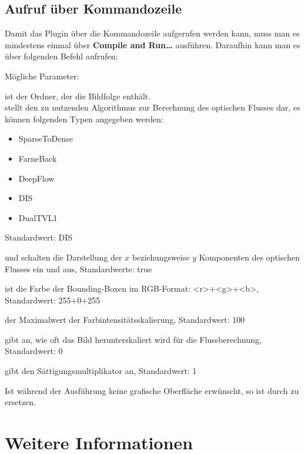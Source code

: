 \section{Aufruf über Kommandozeile}

Damit das Plugin über die Kommandozeile aufgerufen werden kann, muss man es mindestens einmal über \textbf{Compile and Run\dots} ausführen. Daraufhin kann man es über folgenden Befehl aufrufen:



Mögliche Parameter:

 ist der Ordner, der die Bildfolge enthält.
 \\

 stellt den zu nutzenden Algorithmus zur Berechnung des optischen Flusses dar, es können folgenden Typen angegeben werden:

\begin{itemize}
\item SparseToDense
\item FarneBack
\item DeepFlow
\item DIS
\item DualTVL1
\end{itemize}

Standardwert: DIS 

 und  schalten die Darstellung der $x$ beziehungsweise $y$ Komponenten des optischen Flusses ein und aus, Standardwerte: true

 ist die Farbe der Bounding-Boxen im RGB-Format: <r>+<g>+<b>, Standardwert: 255+0+255

 der Maximalwert der Farbintensitätsskalierung, Standardwert: 100

 gibt an, wie oft das Bild herunterskaliert wird für die Flussberechnung, Standardwert: 0

 gibt den Sättigungsmultiplikator an, Standardwert: 1


Ist während der Ausführung keine grafische Oberfläche erwünscht, so ist  durch  zu ersetzen.

\chapter{Weitere Informationen}

